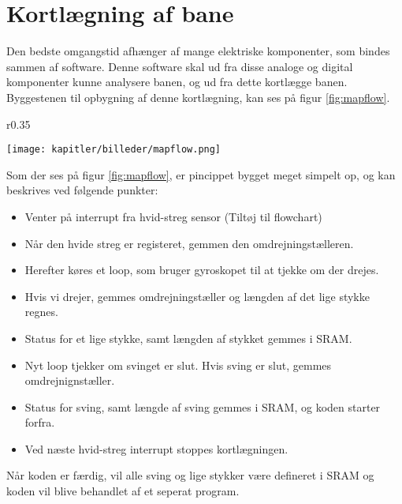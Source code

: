 \newpage
\section{Kortlægning af bane}
Den bedste omgangstid afhænger af mange elektriske komponenter, som bindes sammen af software.
Denne software skal ud fra disse analoge og digital komponenter kunne analysere banen, og ud fra dette
kortlægge banen. Byggestenen til opbygning af denne kortlægning, kan ses på figur \ref{fig:mapflow}.

\begin{wrapfigure}{r}{0.35\textwidth}
  \vspace{-10pt}
  \begin{center}
      \texttt{[image: kapitler/billeder/mapflow.png]}
    \end{center}
    \vspace{-10pt}
    \caption{Viser grundstenene af koden til kortlægning af banen.}
    \label{fig:mapflow}
\end{wrapfigure}

Som der ses på figur \ref{fig:mapflow}, er pincippet bygget meget simpelt op, og kan beskrives ved følgende punkter:

\begin{itemize}
\item Venter på interrupt fra hvid-streg sensor (Tiltøj til flowchart)
\item Når den hvide streg er registeret, gemmen den omdrejningstælleren.
\item Herefter køres et loop, som bruger gyroskopet til at tjekke om der drejes.
\item Hvis vi drejer, gemmes omdrejningstæller og længden af det lige stykke regnes.
\item Status for et lige stykke, samt længden af stykket gemmes i SRAM.
\item Nyt loop tjekker om svinget er slut. Hvis sving er slut, gemmes omdrejnignstæller.
\item Status for sving, samt længde af sving gemmes i SRAM, og koden starter forfra.
\item Ved næste hvid-streg interrupt stoppes kortlægningen.
\end{itemize}

Når koden er færdig, vil alle sving og lige stykker være defineret i SRAM og koden vil blive behandlet
af et seperat program. 
